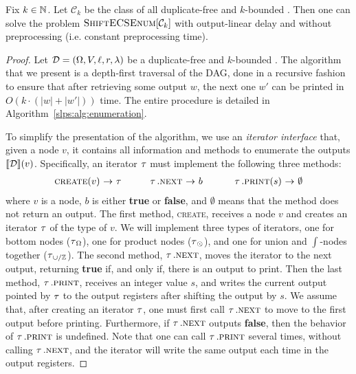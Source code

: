 \begin{proposition}\label{slps:prop:lindelay}
	Fix $k\in\mathbb{N}$. 
	Let $\mathcal{C}_k$ be the class of all  duplicate-free and $k$-bounded \dsabbrs{}. Then one can solve the problem $\textsc{ShiftECSEnum}[\mathcal{C}_k]$ with output-linear delay and without preprocessing (i.e. constant preprocessing time).
\end{proposition}
\begin{proof}
	\newcommand{\len}{\mathsf{len}}
	
	Let $\mathcal{D} = (\Omega, V, \ell, r, \lambda)$ be a duplicate-free and $k$-bounded \dsabbr{}.
	The algorithm that we present is a depth-first traversal of the DAG, done in a recursive fashion to ensure that after retrieving some output $w$, the next one $w'$ can be printed in $O(k\cdot (|w| + |w'|))$ time. The entire procedure is detailed in Algorithm~\ref{slps:alg:enumeration}.
	
	
	
	To simplify the presentation of the algorithm, we use an \emph{iterator interface} that, given a node $v$, it contains all information and methods to enumerate the outputs ${\llbracket{\mathcal{D}}\rrbracket}(v)$. Specifically, an iterator $\operatorname{\tau}$ must implement the following three methods:
	\[
	\begin{array}{rclrclrcl}
		\textsc{create}(v) & \!\!\!\!\rightarrow\!\!\!\! & \uit   \ \ \ \ \ \	 & \uit.\textsc{next} & \!\!\!\! \rightarrow \!\!\!\! & b  \ \ \ \ \ \ \ &  \uit.\textsc{print}(s)  & \!\!\!\!\rightarrow\!\!\!\! & \emptyset
	\end{array}
	\]
	where $v$ is a node, $b$ is either {\bf true} or {\bf false}, and $\emptyset$ means that the method does not return an output. 
	The first method, \textsc{create}, receives a node $v$ and creates an iterator $\operatorname{\tau}$ of the type of $v$. We will implement three types of iterators, one for bottom nodes ($\operatorname{\tau}_\Omega$), one for product nodes ($\operatorname{\tau}_\odot$), and one for union and $\int$-nodes together ($\operatorname{\tau}_{\cup/\mathbb{Z}}$). The second method, $\operatorname{\tau}.\textsc{next}$, moves the iterator to the next output, returning {\bf true} if, and only if, there is an output to print. Then the last method, $\operatorname{\tau}.\textsc{print}$, receives an integer value $s$, and writes the current output pointed by $\operatorname{\tau}$ to the output registers after shifting the output by $s$. 
	We assume that, after creating an iterator $\operatorname{\tau}$, one must first call $\operatorname{\tau}.\textsc{next}$ to move to the first output before printing. Furthermore, if $\operatorname{\tau}.\textsc{next}$ outputs {\bf false}, then the behavior of $\operatorname{\tau}.\textsc{print}$ is undefined. Note that one can call $\operatorname{\tau}.\textsc{print}$ several times, without calling $\operatorname{\tau}.\textsc{next}$, and the iterator will write the same output each time in the output registers. 
	

\end{proof}
